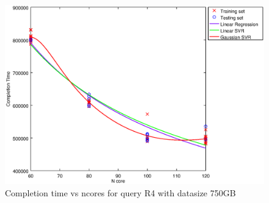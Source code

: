 
\begin {figure}[hbtp]
\centering
\includegraphics[width=\textwidth]{output/R4_750_ONLY_1_OVER_NCORES/plot_R4_750_bestmodels.eps}
\caption{Completion time vs ncores for query R4 with datasize 750GB}
\label{fig:all_nonlinear_R4_750}
\end {figure}
